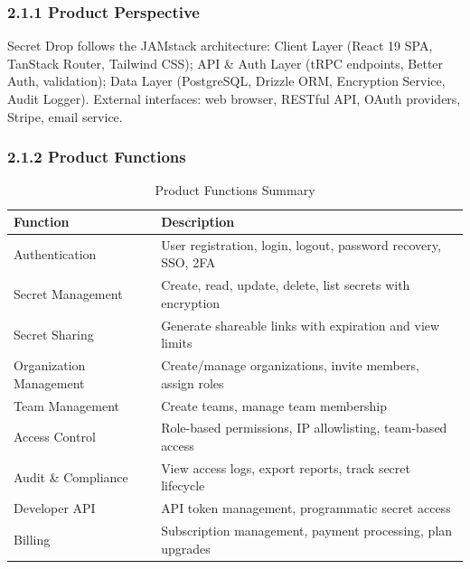 \documentclass[12pt,a4paper]{article}
\begin{document}
\subsubsection*{2.1.1 Product Perspective}
Secret Drop follows the JAMstack architecture: Client Layer (React 19 SPA, TanStack Router, Tailwind CSS); API \& Auth Layer (tRPC endpoints, Better Auth, validation); Data Layer (PostgreSQL, Drizzle ORM, Encryption Service, Audit Logger). External interfaces: web browser, RESTful API, OAuth providers, Stripe, email service.

\subsubsection*{2.1.2 Product Functions}
\begin{table}[H]
  \centering
  \small
  \caption{Product Functions Summary}
  \begin{tabular}{@{}p{3.5cm}p{9cm}@{}}
    \toprule
    \textbf{Function}       & \textbf{Description}                                          \\
    \midrule
    Authentication          & User registration, login, logout, password recovery, SSO, 2FA \\
    \hline
    Secret Management       & Create, read, update, delete, list secrets with encryption    \\
    \hline
    Secret Sharing          & Generate shareable links with expiration and view limits      \\
    \hline
    Organization Management & Create/manage organizations, invite members, assign roles     \\
    \hline
    Team Management         & Create teams, manage team membership                          \\
    \hline
    Access Control          & Role-based permissions, IP allowlisting, team-based access    \\
    \hline
    Audit \& Compliance     & View access logs, export reports, track secret lifecycle      \\
    \hline
    Developer API           & API token management, programmatic secret access              \\
    \hline
    Billing                 & Subscription management, payment processing, plan upgrades    \\
    \bottomrule
  \end{tabular}
\end{table}
\end{document}
